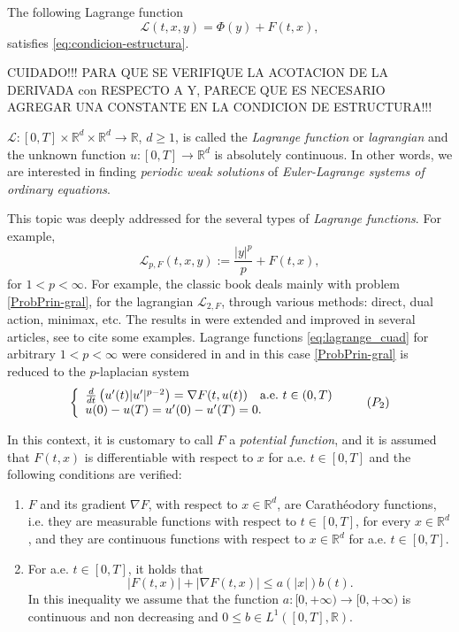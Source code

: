 \documentclass[twoside]{article}
\makeatletter
\theoremstyle{remark}
\newcommand{\labitem}[2]{%
\def\@itemlabel{\textbf{#1}}
\item
\def\@currentlabel{#1}\label{#2}}
\newcommand{\rr}{\mathbb{R}}
\renewcommand{\leq}{\leqslant}
\renewcommand{\geq}{\geqslant}
\newcounter{example}
\makeatother
\begin{document}
The following Lagrange function  
\begin{equation}\label{eq:lagrange_cuad}
\mathcal{L}(t,x,y)=\Phi(y)+F(t,x),
\end{equation}
satisfies \eqref{eq:condicion-estructura}.


CUIDADO!!! PARA QUE SE VERIFIQUE LA ACOTACION DE LA DERIVADA con RESPECTO A Y, PARECE QUE ES NECESARIO AGREGAR UNA CONSTANTE EN LA CONDICION DE ESTRUCTURA!!!

$\mathcal{L}:[0,T]\times\rr^d\times\rr^d\to\rr$, $d\geq 1$, is called the \emph{Lagrange function} or \emph{lagrangian} and the unknown function  $u:[0,T]\to\rr^d$ is absolutely continuous. In other words, we are interested in  finding \emph{periodic weak solutions} of \emph{Euler-Lagrange systems of ordinary equations}.

This topic was deeply addressed for the several types of \emph{Lagrange functions}.  For example,
\begin{equation}\label{eq:lagrange_cuad}
\mathcal{L}_{p,F}(t,x,y):=\frac{|y|^p}{p}+F(t,x),
\end{equation}
for $1<p<\infty$. For example, the classic book  \cite{mawhin2010critical} deals mainly with problem \eqref{ProbPrin-gral}, for the lagrangian $\mathcal{L}_{2,F}$, through various methods: direct, dual action, minimax, etc. The results in \cite{mawhin2010critical} were extended and improved in several articles,  see  \cite{tang1995periodic,tang1998periodic,wu1999periodic,tang2001periodic,zhao2004periodic}  to cite some examples. Lagrange functions \eqref{eq:lagrange_cuad} for arbitrary $1<p<\infty$ were considered in  \cite{Tian2007192,tang2010periodic} and in this case \eqref{ProbPrin-gral}  is reduced to the $p$-laplacian system
\begin{equation}\label{ProbP-lapla}
    \left\{%
\begin{array}{ll}
   \frac{d}{dt}\left(u'(t)|u'|^{p-2}\right) = \nabla F(t,u(t)) \quad \hbox{a.e.}\ t \in (0,T)\\
    u(0)-u(T)=u'(0)-u'(T)=0.
\end{array}%
\right.\tag{$P_2$}
\end{equation}


In this context, it  is customary to call $F$ a  \emph{potential function}, and it is assumed that $F(t,x)$ is differentiable with respect to $x$ for a.e. $t\in [0,T]$ and the following conditions are verified:
\begin{enumerate}
\labitem{(C)}{item:condicion_c} $F$ and its gradient $\nabla F$, with respect to $x\in\rr^d$,  are  Carath\'eodory functions, i.e. they are measurable functions with respect to $t\in [0,T]$, for every  $x\in\rr^d$, and they are continuous functions with  respect to  $x\in\rr^d$ for a.e. $t \in [0,T]$.
 \labitem{(A)}{item:condicion_a}  For   a.e. $t\in [0,T]$, it holds that
\begin{equation}
|F(t,x)| + |\nabla F(t,x)|  \leq a(|x|)b(t).
\end{equation}
In this inequality we assume that the function  $a:[0,+\infty)\to [0,+\infty)$ is continuous and non decreasing and $0\leq b\in L^1([0,T],\rr)$.
\end{enumerate}
\end{document}

